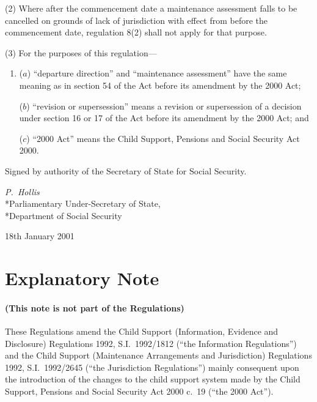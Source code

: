 \documentclass[12pt,a4paper]{article}
\begin{document}
(2) Where after the commencement date a maintenance assessment falls to be cancelled on grounds of lack of jurisdiction with effect from before the commencement date, regulation 8(2) shall not apply for that purpose.

(3) For the purposes of this regulation—
\begin{enumerate}\item[]
($a$) “departure direction” and “maintenance assessment” have the same meaning as in section 54 of the Act before its amendment by the 2000 Act;

($b$) “revision or supersession” means a revision or supersession of a decision under section 16 or 17 of the Act before its amendment by the 2000 Act; and

($c$) “2000 Act” means the Child Support, Pensions and Social Security Act 2000.
\end{enumerate}


\bigskip

Signed 
by authority of the Secretary of State for Social Security.

{\raggedleft
\emph{P.~Hollis}\\*Parliamentary Under-Secretary of State,\\*Department of Social Security

}

18th January 2001

\small

\part{Explanatory Note}

\renewcommand\parthead{— Explanatory Note}

\subsection*{(This note is not part of the Regulations)}

These Regulations amend the Child Support (Information, Evidence and Disclosure) Regulations 1992, S.I.\ 1992/1812 (“the Information Regulations”) and the Child Support (Maintenance Arrangements and Jurisdiction) Regulations 1992, S.I.\ 1992/2645 (“the Jurisdiction Regulations”) mainly consequent upon the introduction of the changes to the child support system made by the Child Support, Pensions and Social Security Act 2000 c.\ 19 (“the 2000 Act”).
\end{document}
